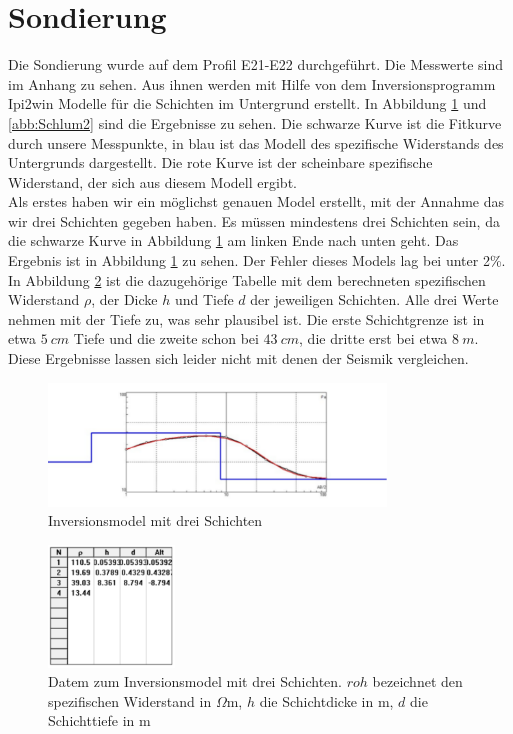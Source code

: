 \section{Sondierung}
Die Sondierung wurde auf dem Profil E21-E22 durchgeführt. Die Messwerte sind im Anhang zu sehen. Aus ihnen werden mit Hilfe von dem Inversionsprogramm Ipi2win Modelle für die Schichten im Untergrund erstellt. In Abbildung \ref{abb:Schlum1} und \ref{abb:Schlum2} sind die Ergebnisse zu sehen. Die schwarze Kurve ist die Fitkurve durch unsere Messpunkte, in blau ist das Modell des spezifische Widerstands des Untergrunds dargestellt. Die rote Kurve ist der scheinbare spezifische Widerstand, der sich aus diesem Modell ergibt.\\
Als erstes haben wir ein möglichst genauen Model erstellt, mit der Annahme das wir drei Schichten gegeben haben. Es müssen mindestens drei Schichten sein, da die schwarze Kurve in Abbildung \ref{abb:Schlum1} am linken Ende nach unten geht. Das Ergebnis ist in Abbildung \ref{abb:Schlum1} zu sehen. Der Fehler dieses Models lag bei unter 2\%. In Abbildung \ref{abb:SchlumTab1} ist die dazugehörige Tabelle mit dem berechneten spezifischen Widerstand $\rho$, der Dicke $h$ und Tiefe $d$ der jeweiligen Schichten.  Alle drei Werte nehmen mit der Tiefe zu, was sehr plausibel ist. Die erste Schichtgrenze ist in etwa $\SI{5}{cm}$ Tiefe und die zweite schon bei $\SI{43}{cm}$, die dritte erst bei etwa $\SI{8}{m}$. Diese Ergebnisse lassen sich leider nicht mit denen der Seismik vergleichen. 



\begin{figure}[h]
\centering
\includegraphics[width=0.8\textwidth]{fig/Schlumberger_3Schichten.pdf}
\caption{Inversionsmodel mit drei Schichten }
\label{abb:Schlum1}
\end{figure}
\begin{figure}[h]
\centering
\includegraphics[width=0.3\textwidth]{fig/schlumbergerTabelle.pdf}
\caption{Datem zum Inversionsmodel mit drei Schichten. $roh$ bezeichnet den spezifischen Widerstand in $\Omega$m, $h$ die Schichtdicke in m, $d$ die Schichttiefe in m}
\label{abb:SchlumTab1}
\end{figure}


